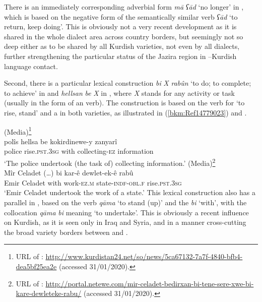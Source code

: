 \documentclass[output=paper]{langsci/langscibook}
\begin{document}
There is an immediately corresponding adverbial form \textit{mā} \textit{ʕād} ‘no longer’ in , which is based on the negative form of the semantically similar verb \textit{ʕād} ‘to return, keep doing’. This is obviously not a very recent development as it is shared in the whole dialect area across country borders, but seemingly not so deep either as to be shared by all Kurdish varieties, not even by all  dialects, further strengthening the particular status of the Jazira region in --Kurdish language contact. 

Second, there is a particular lexical construction \textit{bi} \textit{X} \textit{rabûn} ‘to do; to complete; to achieve’ in  and \textit{hellsan} \textit{be} \textit{X} in , where \textit{X} stands for any activity or task (usually in the form of an  verb). The construction is based on the verb for ‘to rise, stand’ and a  in both varieties, as illustrated in (\ref{bkm:Ref14779023}) and .

\ea {} (Media)\label{bkm:Ref14779023}\footnote{URL of : \url{http://www.kurdistan24.net/so/news/5ca67132-7a7f-4840-bfb4-dea5bf25ea2e} (accessed 31/01/2020).}\\
\gll polîs hellsa be kokirdinewe-y zanyarî\\
     police rise.\textsc{pst.3sg} with collecting-\textsc{ez} information\\
\glt ‘The police undertook (the task of) collecting information.’
\ex \label{17}  (Media)\footnote{URL of : \url{http://portal.netewe.com/mir-celadet-bedirxan-bi-tene-sere-xwe-bi-kare-dewleteke-rabu/} (accessed 31/01/2020).}\\
\gll Mîr {Celadet (…)} bi kar-ê dewlet-ek-ê rabû\\
     Emir Celadet with work-\textsc{ez.m} state-\textsc{indf-obl.f} rise.\textsc{pst.3sg}       \\
\glt ‘Emir Celadet undertook the work of a state.’\z
This lexical construction also has a parallel in  , based on the verb \textit{qāma} ‘to stand (up)’ and the  \textit{bi} ‘with’, with the collocation \textit{qāma} \textit{bi} meaning ‘to undertake’. This is obviously a recent influence on Kurdish, as it is seen only in Iraq and Syria, and in a manner cross-cutting the broad variety borders between  and . 
\end{document}
